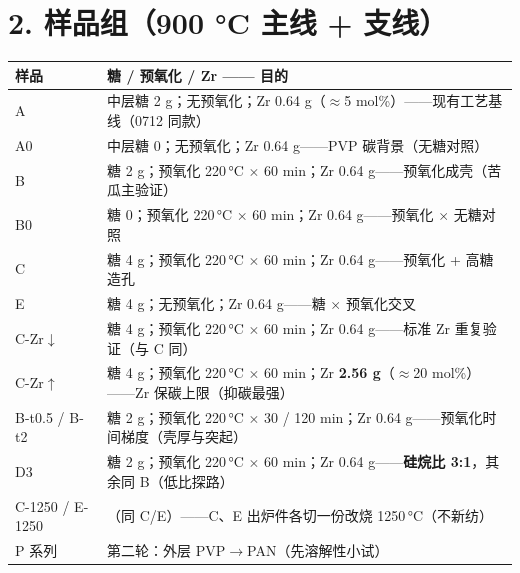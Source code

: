 \documentclass[a4paper, 10pt]{ctexart}
\begin{document}
\section*{2. 样品组（900 °C 主线 + 支线）}
\begin{tabular}{l p{12.3cm}}
\toprule
样品 & 糖 / 预氧化 / Zr —— 目的 \\
\midrule
A & 中层糖 2 g；无预氧化；Zr 0.64 g（$\approx$5 mol\%）——现有工艺基线（0712 同款） \\
A0 & 中层糖 0；无预氧化；Zr 0.64 g——PVP 碳背景（无糖对照） \\
B & 糖 2 g；预氧化 220\,°C $\times$ 60 min；Zr 0.64 g——预氧化成壳（苦瓜主验证） \\
B0 & 糖 0；预氧化 220\,°C $\times$ 60 min；Zr 0.64 g——预氧化 $\times$ 无糖对照 \\
C & 糖 4 g；预氧化 220\,°C $\times$ 60 min；Zr 0.64 g——预氧化 + 高糖造孔 \\
E & 糖 4 g；无预氧化；Zr 0.64 g——糖 $\times$ 预氧化交叉 \\
C-Zr$\downarrow$ & 糖 4 g；预氧化 220\,°C $\times$ 60 min；Zr 0.64 g——标准 Zr 重复验证（与 C 同） \\
C-Zr$\uparrow$ & 糖 4 g；预氧化 220\,°C $\times$ 60 min；Zr \textbf{2.56 g}（$\approx$20 mol\%）——Zr 保碳上限（抑碳最强） \\
B-t0.5 / B-t2 & 糖 2 g；预氧化 220\,°C $\times$ 30 / 120 min；Zr 0.64 g——预氧化时间梯度（壳厚与突起） \\
D3 & 糖 2 g；预氧化 220\,°C $\times$ 60 min；Zr 0.64 g——\textbf{硅烷比 3:1}，其余同 B（低比探路） \\
C-1250 / E-1250 & （同 C/E）——C、E 出炉件各切一份改烧 1250\,°C（不新纺） \\
P 系列 & 第二轮：外层 PVP$\rightarrow$PAN（先溶解性小试） \\
\bottomrule
\end{tabular}
\end{document}
